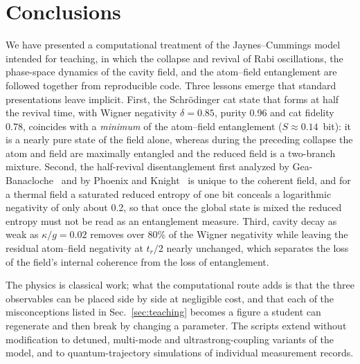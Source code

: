 \documentclass{iopjournal}
\begin{document}
\section{Conclusions}
\label{sec:conclusions}

We have presented a computational treatment of the Jaynes--Cummings model intended for teaching, in which the collapse and revival of Rabi oscillations, the phase-space dynamics of the cavity field, and the atom--field entanglement are followed together from reproducible code. Three lessons emerge that standard presentations leave implicit. First, the Schr\"{o}dinger cat state that forms at half the revival time, with Wigner negativity $\delta = 0.85$, purity 0.96 and cat fidelity 0.78, coincides with a \emph{minimum} of the atom--field entanglement ($S \approx 0.14$~bit): it is a nearly pure state of the field alone, whereas during the preceding collapse the atom and field are maximally entangled and the reduced field is a two-branch mixture. Second, the half-revival disentanglement first analyzed by Gea-Banacloche~\cite{gea-banacloche1990} and by Phoenix and Knight~\cite{phoenix1988, phoenix1991} is unique to the coherent field, and for a thermal field a saturated reduced entropy of one bit conceals a logarithmic negativity of only about 0.2, so that once the global state is mixed the reduced entropy must not be read as an entanglement measure. Third, cavity decay as weak as $\kappa/g = 0.02$ removes over 80\% of the Wigner negativity while leaving the residual atom--field negativity at $t_r/2$ nearly unchanged, which separates the loss of the field's internal coherence from the loss of entanglement.

The physics is classical work; what the computational route adds is that the three observables can be placed side by side at negligible cost, and that each of the misconceptions listed in Sec.~\ref{sec:teaching} becomes a figure a student can regenerate and then break by changing a parameter. The scripts extend without modification to detuned, multi-mode and ultrastrong-coupling variants of the model, and to quantum-trajectory simulations of individual measurement records.




\end{document}
